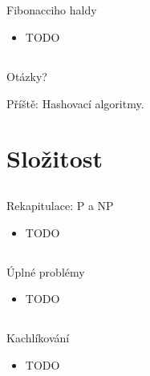 \documentclass{beamer}
\begin{document}
\subsection{}
\begin{frame}{Fibonacciho haldy}
\begin{itemize}
\item TODO
\end{itemize}
\end{frame}

\subsection{}
\begin{frame}{Otázky?}
\begin{center}
Příště: Hashovací algoritmy.
\end{center}
\end{frame}

\section{Složitost}

\subsection{}
\begin{frame}{Rekapitulace: P a NP}
\begin{itemize}
\item TODO
\end{itemize}
\end{frame}

\subsection{}
\begin{frame}{Úplné problémy}
\begin{itemize}
\item TODO
\end{itemize}
\end{frame}

\subsection{}
\begin{frame}{Kachlíkování}
\begin{itemize}
\item TODO
\end{itemize}
\end{frame}
\end{document}
